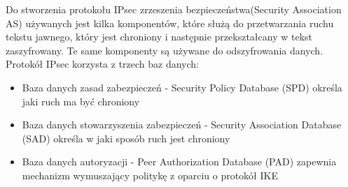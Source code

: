 \documentclass[12p]{article}
\begin{document}
Do stworzenia protokołu IPsec zrzeszenia bezpieczeństwa(Security Association AS) używanych jest kilka komponentów, które służą do przetwarzania ruchu tekstu jawnego, który jest chroniony i następnie przekształcany w tekst zaszyfrowany. Te same komponenty są używane do odszyfrowania danych. Protokół IPsec korzysta z trzech baz danych: 
\begin{itemize}
\item Baza danych zasad zabezpieczeń - Security Policy Database (SPD) określa jaki ruch ma być chroniony
\item Baza danych stowarzyszenia zabezpieczeń - Security Association Database (SAD) określa w jaki sposób ruch jest chroniony
\item Baza danych autoryzacji - Peer Authorization Database (PAD) zapewnia mechanizm wymuszający  politykę z oparciu o protokół IKE
\end{itemize}
\end{document}
